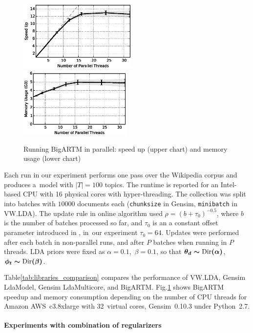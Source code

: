 \documentclass{sig-alternate}
\begin{document}
\begin{figure}[t]
	\centering
	\includegraphics[height=35mm]{bigartm_speedup.eps}
	\includegraphics[height=35mm]{bigartm_memory.eps}
	\caption{Running BigARTM in parallel: speed up (upper chart) and memory usage (lower chart)}
	\label{fig:bigartm_speedup}
\end{figure}

Each run in our experiment performs one pass over the Wikipedia corpus and produces a~model with $|T|=100$ topics.
The runtime is reported for an Intel-based CPU with 16 physical cores with hyper-threading.
The collection was split into batches with $10 000$ documents each
(\texttt{chunksize} in Gensim, \texttt{minibatch} in VW.LDA).
The update rule in online algorithm used
${\rho = (b + \tau_0)^{-0.5}}$,
where $b$ is the number of batches processed so far,
and $\tau_0$ is an a constant offset parameter introduced in \cite{hoffman10online},
in~our experiment ${\tau_0 = 64}$.
\mbox{Updates} were performed after each batch in non-parallel runs, and after $P$ batches when running in $P$ threads.
LDA priors were fixed as
${\alpha = 0.1}$,\, ${\beta = 0.1}$,
so that
$\boldmath{\theta}_d \sim \text{Dir}(\alpha)$,\,
$\boldmath{\phi}_t \sim \text{Dir}(\beta)$.

Table\;\ref{tab:libraries_comparison} compares the performance of
VW.LDA, Gensim LdaModel, Gensim LdaMulticore, and BigARTM.
%
Fig.\;\ref{fig:bigartm_speedup} shows BigARTM speedup and memory consumption depending on the number of CPU threads
for Amazon AWS~c3.8xlarge with 32~virtual cores,
Gensim~\mbox{0.10.3} under Python~\mbox{2.7}.


\paragraph{Experiments with combination of regularizers}
\end{document}
